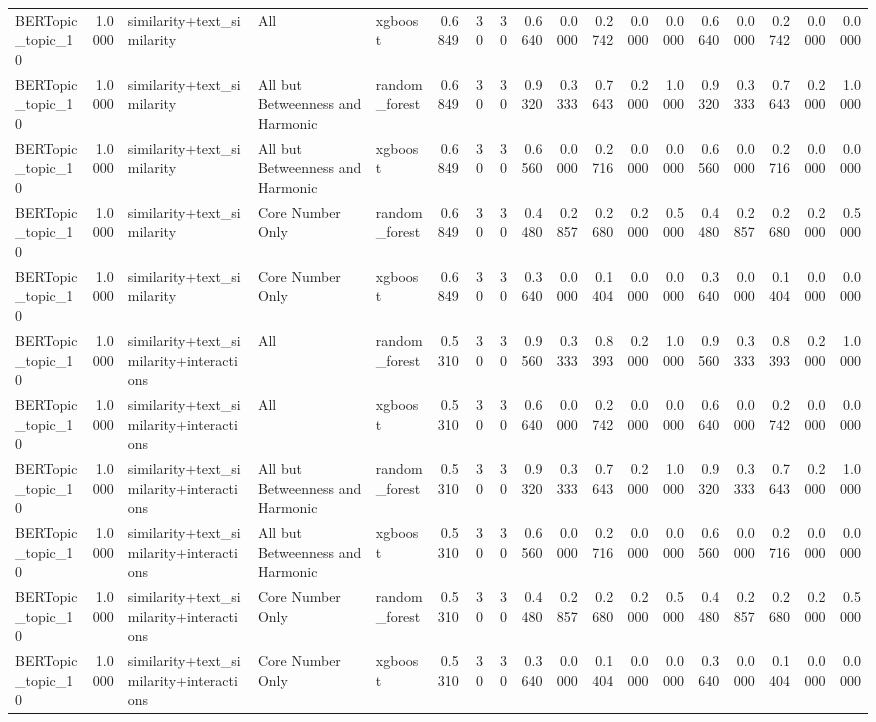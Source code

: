 \begin{tabular}{lrlllrrrrrrrrrrrrr}
BERTopic_topic_10 & 1.0000 & similarity+text_similarity & All & xgboost & 0.6849 & 30 & 30 & 0.6640 & 0.0000 & 0.2742 & 0.0000 & 0.0000 & 0.6640 & 0.0000 & 0.2742 & 0.0000 & 0.0000 \\
BERTopic_topic_10 & 1.0000 & similarity+text_similarity & All but Betweenness and Harmonic & random_forest & 0.6849 & 30 & 30 & 0.9320 & 0.3333 & 0.7643 & 0.2000 & 1.0000 & 0.9320 & 0.3333 & 0.7643 & 0.2000 & 1.0000 \\
BERTopic_topic_10 & 1.0000 & similarity+text_similarity & All but Betweenness and Harmonic & xgboost & 0.6849 & 30 & 30 & 0.6560 & 0.0000 & 0.2716 & 0.0000 & 0.0000 & 0.6560 & 0.0000 & 0.2716 & 0.0000 & 0.0000 \\
BERTopic_topic_10 & 1.0000 & similarity+text_similarity & Core Number Only & random_forest & 0.6849 & 30 & 30 & 0.4480 & 0.2857 & 0.2680 & 0.2000 & 0.5000 & 0.4480 & 0.2857 & 0.2680 & 0.2000 & 0.5000 \\
BERTopic_topic_10 & 1.0000 & similarity+text_similarity & Core Number Only & xgboost & 0.6849 & 30 & 30 & 0.3640 & 0.0000 & 0.1404 & 0.0000 & 0.0000 & 0.3640 & 0.0000 & 0.1404 & 0.0000 & 0.0000 \\
BERTopic_topic_10 & 1.0000 & similarity+text_similarity+interactions & All & random_forest & 0.5310 & 30 & 30 & 0.9560 & 0.3333 & 0.8393 & 0.2000 & 1.0000 & 0.9560 & 0.3333 & 0.8393 & 0.2000 & 1.0000 \\
BERTopic_topic_10 & 1.0000 & similarity+text_similarity+interactions & All & xgboost & 0.5310 & 30 & 30 & 0.6640 & 0.0000 & 0.2742 & 0.0000 & 0.0000 & 0.6640 & 0.0000 & 0.2742 & 0.0000 & 0.0000 \\
BERTopic_topic_10 & 1.0000 & similarity+text_similarity+interactions & All but Betweenness and Harmonic & random_forest & 0.5310 & 30 & 30 & 0.9320 & 0.3333 & 0.7643 & 0.2000 & 1.0000 & 0.9320 & 0.3333 & 0.7643 & 0.2000 & 1.0000 \\
BERTopic_topic_10 & 1.0000 & similarity+text_similarity+interactions & All but Betweenness and Harmonic & xgboost & 0.5310 & 30 & 30 & 0.6560 & 0.0000 & 0.2716 & 0.0000 & 0.0000 & 0.6560 & 0.0000 & 0.2716 & 0.0000 & 0.0000 \\
BERTopic_topic_10 & 1.0000 & similarity+text_similarity+interactions & Core Number Only & random_forest & 0.5310 & 30 & 30 & 0.4480 & 0.2857 & 0.2680 & 0.2000 & 0.5000 & 0.4480 & 0.2857 & 0.2680 & 0.2000 & 0.5000 \\
BERTopic_topic_10 & 1.0000 & similarity+text_similarity+interactions & Core Number Only & xgboost & 0.5310 & 30 & 30 & 0.3640 & 0.0000 & 0.1404 & 0.0000 & 0.0000 & 0.3640 & 0.0000 & 0.1404 & 0.0000 & 0.0000 \\

\end{tabular}
